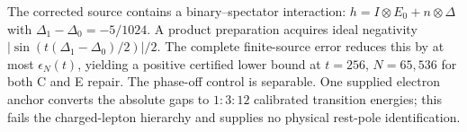 The corrected source contains a binary--spectator interaction:
$h=I\otimes E_0+n\otimes\Delta$ with
$\Delta_1-\Delta_0=-5/1024$.  A product preparation acquires ideal negativity
$|\sin(t(\Delta_1-\Delta_0)/2)|/2$.  The complete finite-source error reduces
this by at most $\epsilon_N(t)$, yielding a positive certified lower bound at
$t=256$, $N=65{,}536$ for both C and E repair.  The phase-off control is
separable.  One supplied electron anchor converts the absolute gaps to
$1:3:12$ calibrated transition energies; this fails the charged-lepton
hierarchy and supplies no physical rest-pole identification.
